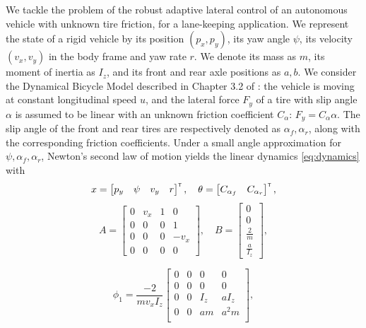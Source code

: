 We tackle the problem of the robust adaptive lateral control of an autonomous vehicle with unknown tire friction, for a lane-keeping application. We represent the state of a rigid vehicle by its position $(p_x, p_y)$, its yaw angle $\psi$, its velocity $(v_x, v_y)$ in the body frame and yaw rate $r$. We denote its mass as $m$, its moment of inertia as $I_z$, and its front and rear axle positions as $a,b$. We consider the Dynamical Bicycle Model described in Chapter 3.2 of \citep{awan2014compensation}: the vehicle is moving at constant longitudinal speed $u$, and the lateral force $F_y$ of a tire with slip angle $\alpha$ is assumed to be linear with an unknown friction coefficient $C_\alpha$: $F_y = C_\alpha \alpha$. The slip angle of the front and rear tires are respectively denoted as $\alpha_f, \alpha_r$, along with the corresponding friction coefficients.
Under a small angle approximation for $\psi, \alpha_f, \alpha_r$, Newton's second law of motion yields the linear dynamics \eqref{eq:dynamics} with
\begin{align*}
x = \begin{bmatrix} {p_y} & {\psi} & {v_y} & {r} \end{bmatrix}^{\mathsf{\scriptscriptstyle T}},\quad
\theta = \begin{bmatrix} C_{\alpha_f} & C_{\alpha_r}\end{bmatrix}^{\mathsf{\scriptscriptstyle T}},
\end{align*}
\[
A = \begin{bmatrix}
0 & v_x & 1 & 0 \\
0 & 0 & 0 & 1 \\
0 & 0 & 0 & - v_x \\
0 & 0 & 0 & 0
\end{bmatrix},\quad
B =
\begin{bmatrix}
0 \\
0 \\
\frac{2}{m} \\
\frac{a}{I_z}
\end{bmatrix},
\]

\[
\phi_1 = \frac{-2}{m v_x I_z}\begin{bmatrix}
0 & 0 & 0 & 0 \\
0 & 0 & 0 & 0 \\
0 & 0 & I_z & a I_z \\
0 & 0 & a m & a^2 m \\
\end{bmatrix},
\]

